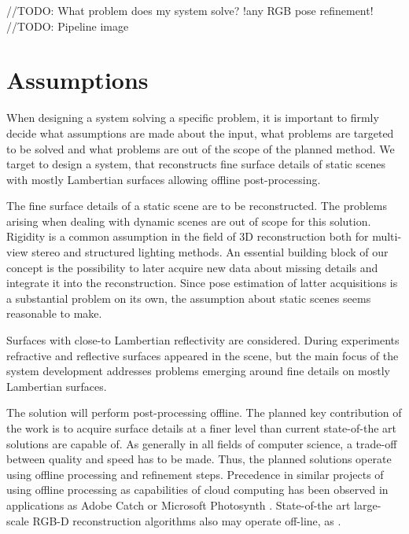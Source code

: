 \documentclass{ucl_thesis}
\begin{document}
//TODO: What problem does my system solve?
!any RGB pose refinement!
//TODO: Pipeline image

\section{Assumptions}
\label{sec:assumptions}

\par When designing a system solving a specific problem, it is important to firmly decide what assumptions are made about the input, what problems are targeted to be solved and what problems are out of the scope of the planned method. We target to design a system, that reconstructs fine surface details of static scenes with mostly Lambertian surfaces allowing offline post-processing. \\

\par The fine surface details of a static scene are to be reconstructed. The problems arising when dealing with dynamic scenes are out of scope for this solution. Rigidity is a common assumption in the field of 3D reconstruction both for multi-view stereo and structured lighting methods. An essential building block of our concept is the possibility to later acquire new data about missing details and integrate it into the reconstruction. Since pose estimation of latter acquisitions is a substantial problem on its own, the assumption about static scenes seems reasonable to make. \\

\par Surfaces with close-to Lambertian reflectivity are considered. During experiments refractive and reflective surfaces appeared in the scene, but the main focus of the system development addresses problems emerging around fine details on mostly Lambertian surfaces. \\

\par The solution will perform post-processing offline. The planned key contribution of the work is to acquire surface details at a finer level than current state-of-the art solutions are capable of. As generally in all fields of computer science, a trade-off between quality and speed has to be made. Thus, the planned solutions operate using offline processing and refinement steps. Precedence in similar projects of using offline processing as capabilities of cloud computing has been observed in applications as Adobe Catch \citep{AdobeCatch} or Microsoft Photosynth \citep{Photosynth}. State-of-the art large-scale RGB-D reconstruction algorithms also may operate off-line, as \citep{Zhou:2013}. \\
\end{document}
